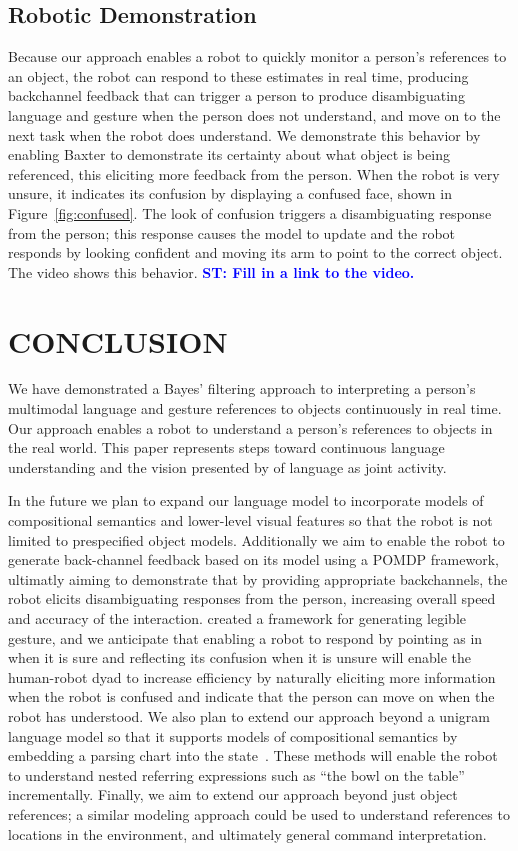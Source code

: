 \documentclass[letterpaper, 10 pt, conference]{ieeeconf}
\newcommand{\stnote}[1]{\textcolor{Blue}{\textbf{ST: #1}}}
\begin{document}
\subsection{Robotic Demonstration}

Because our approach enables a robot to quickly monitor a person's
references to an object, the robot can respond to these estimates in
real time, producing backchannel feedback that can trigger a person to
produce disambiguating language and gesture when the person does not
understand, and move on to the next task when the robot does
understand.  We demonstrate this behavior by enabling Baxter to
demonstrate its certainty about what object is being referenced, this
eliciting more feedback from the person.  When the robot is very
unsure, it indicates its confusion by displaying a confused face,
shown in Figure~\ref{fig:confused}.  The look of confusion triggers a
disambiguating response from the person; this response causes the
model to update and the robot responds by looking confident and moving
its arm to point to the correct object.  The video shows this
behavior. \stnote{Fill in a link to the video.}

\section{CONCLUSION}

We have demonstrated a Bayes' filtering approach to interpreting a
person's multimodal language and gesture references to objects
continuously in real time.  Our approach enables a robot to understand
a person's references to objects in the real world.  This paper
represents steps toward continuous language understanding and the
vision presented by \citet{clark96} of language as joint activity.

In the future we plan to expand our language model to incorporate
models of compositional semantics and lower-level visual features so
that the robot is not limited to prespecified object models.
Additionally we aim to enable the robot to generate back-channel
feedback based on its model using a POMDP framework, ultimatly aiming
to demonstrate that by providing appropriate backchannels, the robot
elicits disambiguating responses from the person, increasing overall
speed and accuracy of the interaction.  \citet{dragan13} created a
framework for generating legible gesture, and we anticipate that
enabling a robot to respond by pointing as in \citet{holladay14} when
it is sure and reflecting its confusion when it is unsure will enable
the human-robot dyad to increase efficiency by naturally eliciting
more information when the robot is confused and indicate that the
person can move on when the robot has understood.  We also plan to
extend our approach beyond a unigram language model so that it
supports models of compositional semantics by embedding a parsing
chart into the state~\citep{jurafsky95, earley70}.  These methods will
enable the robot to understand nested referring expressions such as
``the bowl on the table'' incrementally.  Finally, we aim to extend
our approach beyond just object references; a similar modeling
approach could be used to understand references to locations in the
environment, and ultimately general command interpretation. 



\end{document}
